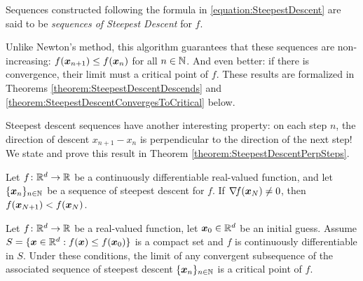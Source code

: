 \begin{remark}
Sequences constructed following the formula in \eqref{equation:SteepestDescent} are said to be \emph{sequences of Steepest Descent} for $f$.

Unlike Newton's method, this algorithm guarantees that these sequences are non-increasing: $f(\boldsymbol{x}_{n+1}) \leq f(\boldsymbol{x}_n)$ for all $n \in \mathbb{N}$.  And even better: if there is convergence, their limit must a critical point of $f$.  These results are formalized in Theorems \ref{theorem:SteepestDescentDescends} and \ref{theorem:SteepestDescentConvergesToCritical}  below.

Steepest descent sequences have another interesting property: on each step $n$, the direction of descent $x_{n+1} - x_n$ is perpendicular to the direction of the next step!  We state and prove this result in Theorem \ref{theorem:SteepestDescentPerpSteps}.
\end{remark}

\begin{theorem}\label{theorem:SteepestDescentDescends}
Let $f\colon \mathbb{R}^d \to \mathbb{R}$ be a continuously differentiable real-valued function, and let $\{ \boldsymbol{x}_n \}_{n\in\mathbb{N}}$ be a sequence of steepest descent for $f$.  If $\mathop{\nabla\! {f}}(\boldsymbol{x}_N) \neq 0$, then $f(\boldsymbol{x}_{N+1}) < f(\boldsymbol{x}_N)$.
\end{theorem}

\begin{theorem}\label{theorem:SteepestDescentConvergesToCritical}
Let $f\colon \mathbb{R}^d \to \mathbb{R}$ be a real-valued function, let $\boldsymbol{x}_0 \in \mathbb{R}^d$ be an initial guess.  Assume $S = \{ \boldsymbol{x} \in \mathbb{R}^d :  f(\boldsymbol{x}) \leq f(\boldsymbol{x}_0) \}$ is a compact set and $f$ is continuously differentiable in $S$.  Under these conditions, the limit of any convergent subsequence of the associated sequence of steepest descent $\{ \boldsymbol{x}_n \}_{n\in \mathbb{N}}$ is a critical point of $f$.
\end{theorem}

